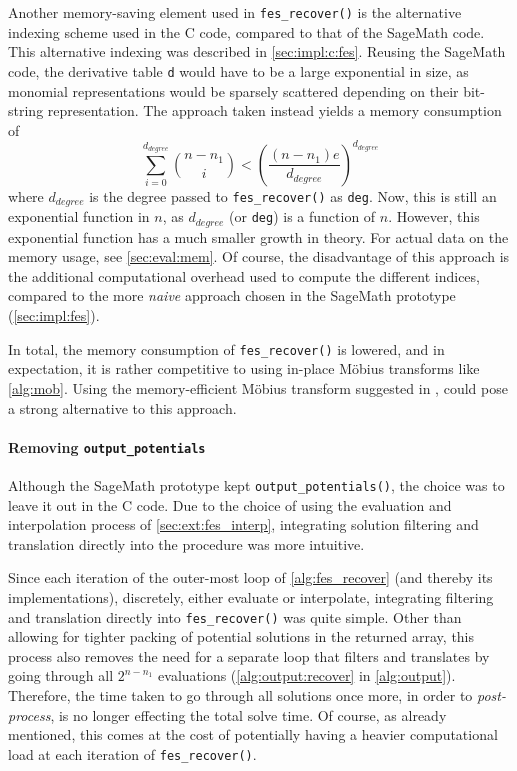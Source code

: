 Another memory-saving element used in \texttt{fes\_recover()} is the alternative indexing scheme used in the C code, compared to that of the SageMath code. This alternative indexing was described in \cref{sec:impl:c:fes}. Reusing the SageMath code, the derivative table \texttt{d} would have to be a large exponential in size, as monomial representations would be sparsely scattered depending on their bit-string representation. The approach taken instead yields a memory consumption of 
$$
    \sum_{i = 0 }^{d_{degree}} \binom{n - n_1}{i} < \left(\frac{(n - n_1)e}{d_{degree}}\right)^{d_{degree}}
$$
where $d_{degree}$ is the degree passed to \texttt{fes\_recover()} as \texttt{deg}. Now, this is still an exponential function in $n$, as $d_{degree}$ (or \texttt{deg}) is a function of $n$. However, this exponential function has a much smaller growth in theory. For actual data on the memory usage, see \cref{sec:eval:mem}. Of course, the disadvantage of this approach is the additional computational overhead used to compute the different indices, compared to the more \textit{naive} approach chosen in the SageMath prototype (\cref{sec:impl:fes}).

In total, the memory consumption of \texttt{fes\_recover()} is lowered, and in expectation, it is rather competitive to using in-place Möbius transforms like \cref{alg:mob}. Using the memory-efficient Möbius transform suggested in \cite{eurocrypt-2021-30841}, could pose a strong alternative to this approach.

\paragraph*{Removing \texttt{output\_potentials}} Although the SageMath prototype kept \texttt{output\_potentials()}, the choice was to leave it out in the C code. Due to the choice of using the evaluation and interpolation process of \cref{sec:ext:fes_interp}, integrating solution filtering and translation directly into the procedure was more intuitive.

Since each iteration of the outer-most loop of \cref{alg:fes_recover} (and thereby its implementations), discretely, either evaluate or interpolate, integrating filtering and translation directly into \texttt{fes\_recover()} was quite simple. Other than allowing for tighter packing of potential solutions in the returned array, this process also removes the need for a separate loop that filters and translates by going through all $2^{n - n_1}$ evaluations (\cref{alg:output:recover} in \cref{alg:output}). Therefore, the time taken to go through all solutions once more, in order to \textit{post-process}, is no longer effecting the total solve time. Of course, as already mentioned, this comes at the cost of potentially having a heavier computational load at each iteration of \texttt{fes\_recover()}.

